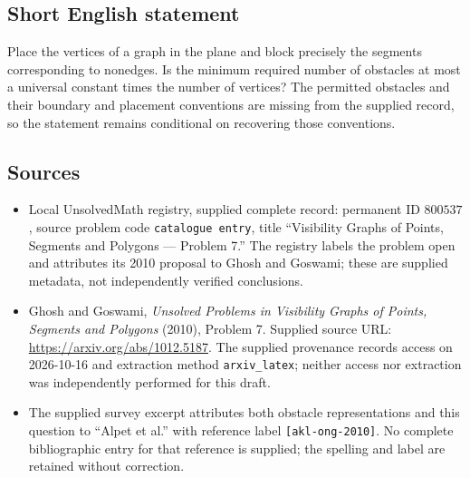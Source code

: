\documentclass[11pt]{article}
\begin{document}
\subsection{Short English statement}
Place the vertices of a graph in the plane and block precisely the segments corresponding to nonedges. Is the minimum required number of obstacles at most a universal constant times the number of vertices? The permitted obstacles and their boundary and placement conventions are missing from the supplied record, so the statement remains conditional on recovering those conventions.
\subsection{Sources}
\begin{itemize}
\item Local UnsolvedMath registry, supplied complete record: permanent ID \(800537\), source problem code \texttt{catalogue entry}, title ``Visibility Graphs of Points, Segments and Polygons --- Problem 7.'' The registry labels the problem open and attributes its 2010 proposal to Ghosh and Goswami; these are supplied metadata, not independently verified conclusions.
\item Ghosh and Goswami, \emph{Unsolved Problems in Visibility Graphs of Points, Segments and Polygons} (2010), Problem 7. Supplied source URL: \url{https://arxiv.org/abs/1012.5187}. The supplied provenance records access on 2026-10-16 and extraction method \texttt{arxiv\_latex}; neither access nor extraction was independently performed for this draft.
\item The supplied survey excerpt attributes both obstacle representations and this question to ``Alpet et al.'' with reference label \texttt{[akl-ong-2010]}. No complete bibliographic entry for that reference is supplied; the spelling and label are retained without correction.
\end{itemize}
\end{document}
